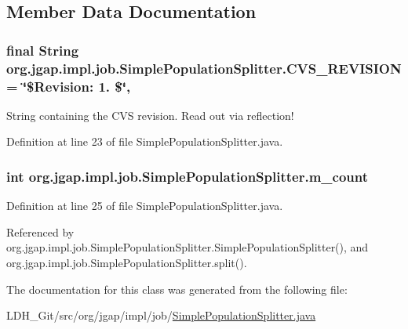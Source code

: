 \subsection{Member Data Documentation}
\hypertarget{classorg_1_1jgap_1_1impl_1_1job_1_1_simple_population_splitter_a1605b012477f7f3daff2a5a6468d9308}{
\subsubsection[{C\-V\-S\-\_\-\-R\-E\-V\-I\-S\-I\-O\-N}]{\setlength{\rightskip}{0pt plus 5cm}final String org.\-jgap.\-impl.\-job.\-Simple\-Population\-Splitter.\-C\-V\-S\-\_\-\-R\-E\-V\-I\-S\-I\-O\-N = \char`\"{}\$Revision\-: 1. \$\char`\"{}\hspace{0.3cm}{\ttfamily [static]}, {\ttfamily [private]}}}\label{classorg_1_1jgap_1_1impl_1_1job_1_1_simple_population_splitter_a1605b012477f7f3daff2a5a6468d9308}
String containing the C\-V\-S revision. Read out via reflection! 

Definition at line 23 of file Simple\-Population\-Splitter.\-java.

\hypertarget{classorg_1_1jgap_1_1impl_1_1job_1_1_simple_population_splitter_a3183017696cd883e864e53c56e3433d7}{
\subsubsection[{m\-\_\-count}]{\setlength{\rightskip}{0pt plus 5cm}int org.\-jgap.\-impl.\-job.\-Simple\-Population\-Splitter.\-m\-\_\-count\hspace{0.3cm}{\ttfamily [private]}}}\label{classorg_1_1jgap_1_1impl_1_1job_1_1_simple_population_splitter_a3183017696cd883e864e53c56e3433d7}


Definition at line 25 of file Simple\-Population\-Splitter.\-java.



Referenced by org.\-jgap.\-impl.\-job.\-Simple\-Population\-Splitter.\-Simple\-Population\-Splitter(), and org.\-jgap.\-impl.\-job.\-Simple\-Population\-Splitter.\-split().



The documentation for this class was generated from the following file\-:\begin{DoxyCompactItemize}
\item 
L\-D\-H\-\_\-\-Git/src/org/jgap/impl/job/\hyperlink{_simple_population_splitter_8java}{Simple\-Population\-Splitter.\-java}\end{DoxyCompactItemize}
